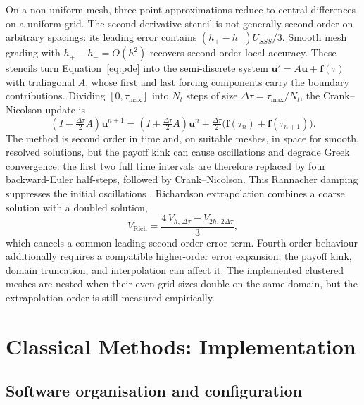 \documentclass[11pt,a4paper]{article}
\begin{document}
On a non-uniform mesh, three-point approximations reduce to central
differences on a uniform grid. The second-derivative stencil is not
generally second order on arbitrary spacings: its leading error contains
\((h_+-h_-)U_{SSS}/3\). Smooth mesh grading with
\(h_+-h_-=O(h^2)\) recovers second-order local accuracy. These stencils turn Equation~\eqref{eq:pde} into the semi-discrete system
\(\mathbf u'=A\mathbf u+\mathbf f(\tau)\) with tridiagonal \(A\), whose
first and last forcing components carry the boundary contributions.
Dividing \([0,\tau_{\max}]\) into \(N_t\) steps of size
\(\Delta\tau=\tau_{\max}/N_t\), the Crank--Nicolson update is
\begin{equation}
 (I-\tfrac{\Delta\tau}{2}A)\mathbf u^{n+1}
 =(I+\tfrac{\Delta\tau}{2}A)\mathbf u^n
 +\tfrac{\Delta\tau}{2}\bigl(\mathbf f(\tau_n)+\mathbf f(\tau_{n+1})\bigr).
 \label{eq:cn}
\end{equation}
The method is second order in time and, on suitable meshes, in space
for smooth, resolved solutions, but the payoff kink can cause oscillations and degrade Greek
convergence: the first two full time intervals are therefore replaced by
four backward-Euler half-steps, followed by Crank--Nicolson. This Rannacher
damping suppresses the initial oscillations \cite{pooley2003}. Richardson
extrapolation combines a coarse solution with a doubled solution,
\begin{equation}
 V_{\mathrm{Rich}}=\frac{4\,V_{h,\,\Delta\tau}-V_{2h,\,2\Delta\tau}}{3},
\end{equation}
which cancels a common leading second-order error term. Fourth-order
behaviour additionally requires a compatible higher-order error expansion;
the payoff kink, domain truncation, and interpolation can affect it. The
implemented clustered meshes are nested when their even grid sizes double
on the same domain, but the extrapolation order is still measured empirically.


\section{Classical Methods: Implementation}
\label{sec:classical-impl}

\subsection{Software organisation and configuration}
\end{document}
